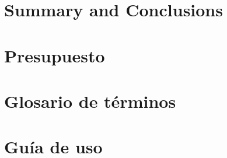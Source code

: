 \documentclass[spanish,a4paper,14pt,oneside]{extreport}
\begin{document}


\newpage{\pagestyle{empty}}
\thispagestyle{empty}

\chapter{Summary and Conclusions }
\label{chapter:ingles}



\newpage{\pagestyle{empty}}
\thispagestyle{empty}

\chapter{Presupuesto}
\label{chapter:presupuesto}



\newpage{\pagestyle{empty}}
\thispagestyle{empty}
\begin{appendix}

\chapter{Glosario de términos}
\label{appendix:1}


\chapter{Guía de uso}
\label{appendix:2}


\end{appendix}

\clearpage
{}

\printindex



\nocite{*}

\end{document}
